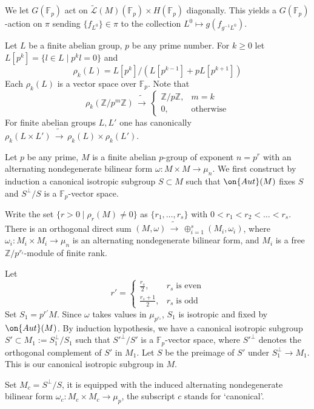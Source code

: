 \documentclass[11pt]{amsart}
\theoremstyle{definition}
\theoremstyle{remark}
\newcommand{\cL}{{\mathcal L}}
\newcommand{\ZZ}{{\mathbb Z}}
\newcommand{\Aut}{\on{Aut}}
\newcommand{\Fp}{\mathbb{F}_p}  %
\newcommand{\iso}{{\widetilde\to}}
\newcommand{\wt}{\widetilde}
\newcommand{\<}{\langle}
\renewcommand{\>}{\rangle}
\begin{document}
 We let $G(\Fp)$ act on $\wt\cL(M)(\Fp)\times H(\Fp)$ diagonally. This yields a $G(\Fp)$-action on $\pi$ sending $\{f_{L^0}\}\in \pi$ to the collection $L^0\mapsto g(f_{g^{-1}L^0})$. 
 

\sssec{} Let $L$ be a finite abelian group, $p$ be any prime number. For $k\ge 0$ let $L[p^k]=\{l\in L\mid p^kl=0\}$ and 
$$
\rho_k(L)=L[p^k]/(L[p^{k-1}]+pL[p^{k+1}])
$$
Each $\rho_k(L)$ is a vector space over $\Fp$. Note that 
$$
\rho_k(\ZZ/p^m\ZZ)\,\iso\, \left\{
\begin{array}{ll}
\ZZ/p\ZZ, & m=k\\
0, & \mbox{otherwise}
\end{array}
\right.
$$
For finite abelian groups $L, L'$ one has canonically $
\rho_k(L\times L')\,\iso\, \rho_k(L)\times \rho_k(L')$.

 Let $p$ be any prime, $M$ is a finite abelian $p$-group of exponent $n=p^r$ with an alternating nondegenerate bilinear form $\omega: M\times M\to \mu_n$. We first construct by induction a canonical isotropic subgroup $S\subset M$ such that $\Aut(M)$ fixes $S$ and $S^{\perp}/S$ is a $\Fp$-vector space.

 Write the set $\{r>0\mid \rho_r(M)\ne 0\}$ as $\{r_1,\ldots, r_s\}$ with $0<r_1<r_2<\ldots <r_s$. There is an orthogonal direct sum $(M,\omega)\,\iso\, \oplus_{i=1}^s (M_i,\omega_i)$, where $\omega_i: M_i\times M_i\to \mu_n$ is an alternating nondegenerate bilinear form, and $M_i$ is a free $\ZZ/p^{r_i}$-module of finite rank. 
 
 Let 
$$
r'=\left\{
\begin{array}{ll}
\frac{r_s}{2}, & r_s\; \mbox{is even}\\
\frac{r_s+1}{2}, & r_s\; \mbox{is odd}
\end{array}
\right.
$$
Set $S_1=p^{r'}M$. Since $\omega$ takes values in $\mu_{p^{r_s}}$, $S_1$ is isotropic and fixed by $\Aut(M)$. By induction hypothesis, we have a canonical isotropic subgroup $S'\subset M_1:=S_1^{\perp}/S_1$ such that $S'^{\perp}/S'$ is a $\Fp$-vector space, where $S'^{\perp}$ denotes the orthogonal complement of $S'$ in $M_1$. Let $S$ be the preimage of $S'$ under $S_1^{\perp}\to M_1$. This is our canonical isotropic subgroup in $M$. 

 Set $M_c=S^{\perp}/S$, it is equipped with the induced alternating nondegenerate bilinear form $\omega_c: M_c\times M_c\to \mu_p$, the subscript $c$ stands for `canonical'.  
 
\end{document}
